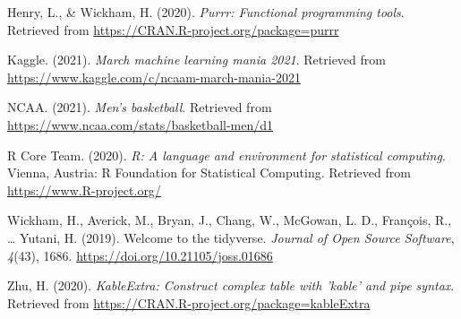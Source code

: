 \documentclass[
  man,floatsintext]{apa6}
\newlength{\cslhangindent}
\newenvironment{cslreferences}%
  {\setlength{\parindent}{0pt}%
  \everypar{\setlength{\hangindent}{\cslhangindent}}\ignorespaces}%
  {\par}
\begin{document}
\hypertarget{refs}{}
\begin{cslreferences}
\leavevmode\hypertarget{ref-R-purrr}{}%
Henry, L., \& Wickham, H. (2020). \emph{Purrr: Functional programming tools}. Retrieved from \url{https://CRAN.R-project.org/package=purrr}

\leavevmode\hypertarget{ref-R-Kaggle}{}%
Kaggle. (2021). \emph{March machine learning mania 2021}. Retrieved from \url{https://www.kaggle.com/c/ncaam-march-mania-2021}

\leavevmode\hypertarget{ref-R-NCAA}{}%
NCAA. (2021). \emph{Men's basketball}. Retrieved from \url{https://www.ncaa.com/stats/basketball-men/d1}

\leavevmode\hypertarget{ref-R-base}{}%
R Core Team. (2020). \emph{R: A language and environment for statistical computing}. Vienna, Austria: R Foundation for Statistical Computing. Retrieved from \url{https://www.R-project.org/}

\leavevmode\hypertarget{ref-R-tidyverse}{}%
Wickham, H., Averick, M., Bryan, J., Chang, W., McGowan, L. D., François, R., \ldots{} Yutani, H. (2019). Welcome to the tidyverse. \emph{Journal of Open Source Software}, \emph{4}(43), 1686. \url{https://doi.org/10.21105/joss.01686}

\leavevmode\hypertarget{ref-R-kableExtra}{}%
Zhu, H. (2020). \emph{KableExtra: Construct complex table with 'kable' and pipe syntax}. Retrieved from \url{https://CRAN.R-project.org/package=kableExtra}
\end{cslreferences}

\endgroup
\end{document}
